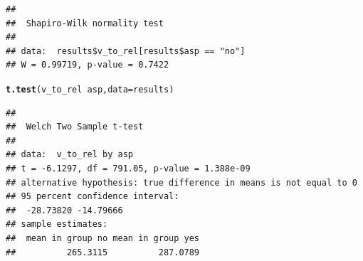 \documentclass[a4paper,11pt]{article}\usepackage[]{graphicx}\usepackage[]{color}
\makeatletter
\newcommand{\hlopt}[1]{\textcolor[rgb]{0,0,0}{#1}}%
\newcommand{\hlstd}[1]{\textcolor[rgb]{0.345,0.345,0.345}{#1}}%
\newcommand{\hlkwc}[1]{\textcolor[rgb]{0.333,0.667,0.333}{#1}}%
\newcommand{\hlkwd}[1]{\textcolor[rgb]{0.737,0.353,0.396}{\textbf{#1}}}%
\newenvironment{kframe}{%
 \def\at@end@of@kframe{}%
 \ifinner\ifhmode%
  \def\at@end@of@kframe{\end{minipage}}%
  \begin{minipage}{\columnwidth}%
 \fi\fi%
 \def\FrameCommand##1{\hskip\@totalleftmargin \hskip-\fboxsep
 \colorbox{shadecolor}{##1}\hskip-\fboxsep
     \hskip-\linewidth \hskip-\@totalleftmargin \hskip\columnwidth}%
 \MakeFramed {\advance\hsize-\width
   \@totalleftmargin\z@ \linewidth\hsize
   \@setminipage}}%
 {\par\unskip\endMakeFramed%
 \at@end@of@kframe}
\newenvironment{knitrout}{}{} %
\makeatother
\begin{document}
\begin{knitrout}
\begin{kframe}
\begin{verbatim}
## 
## 	Shapiro-Wilk normality test
## 
## data:  results$v_to_rel[results$asp == "no"]
## W = 0.99719, p-value = 0.7422
\end{verbatim}
\begin{alltt}
\hlkwd{t.test}\hlstd{(v_to_rel} \hlopt{~} \hlstd{asp,} \hlkwc{data} \hlstd{= results)}
\end{alltt}
\begin{verbatim}
## 
## 	Welch Two Sample t-test
## 
## data:  v_to_rel by asp
## t = -6.1297, df = 791.05, p-value = 1.388e-09
## alternative hypothesis: true difference in means is not equal to 0
## 95 percent confidence interval:
##  -28.73820 -14.79666
## sample estimates:
##  mean in group no mean in group yes 
##          265.3115          287.0789
\end{verbatim}
\end{kframe}
\end{knitrout}
\end{document}
